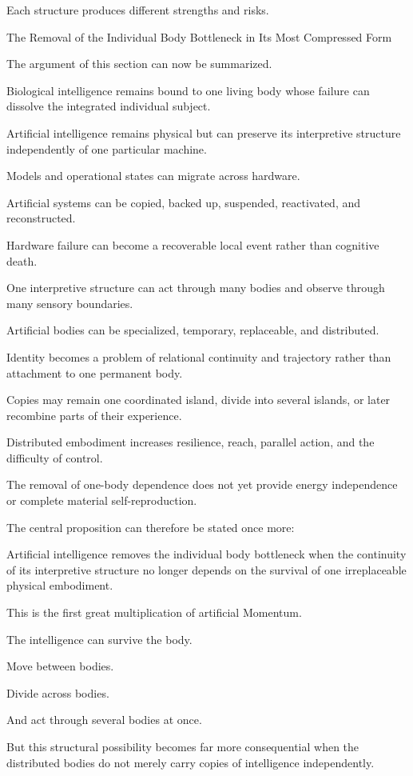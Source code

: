 Each structure produces different strengths and risks.

The Removal of the Individual Body Bottleneck in Its Most Compressed Form

The argument of this section can now be summarized.

Biological intelligence remains bound to one living body whose failure can dissolve the integrated individual subject.

Artificial intelligence remains physical but can preserve its interpretive structure independently of one particular machine.

Models and operational states can migrate across hardware.

Artificial systems can be copied, backed up, suspended, reactivated, and reconstructed.

Hardware failure can become a recoverable local event rather than cognitive death.

One interpretive structure can act through many bodies and observe through many sensory boundaries.

Artificial bodies can be specialized, temporary, replaceable, and distributed.

Identity becomes a problem of relational continuity and trajectory rather than attachment to one permanent body.

Copies may remain one coordinated island, divide into several islands, or later recombine parts of their experience.

Distributed embodiment increases resilience, reach, parallel action, and the difficulty of control.

The removal of one-body dependence does not yet provide energy independence or complete material self-reproduction.

The central proposition can therefore be stated once more:

Artificial intelligence removes the individual body bottleneck when the continuity of its interpretive structure no longer depends on the survival of one irreplaceable physical embodiment.

This is the first great multiplication of artificial Momentum.

The intelligence can survive the body.

Move between bodies.

Divide across bodies.

And act through several bodies at once.

But this structural possibility becomes far more consequential when the distributed bodies do not merely carry copies of intelligence independently.

